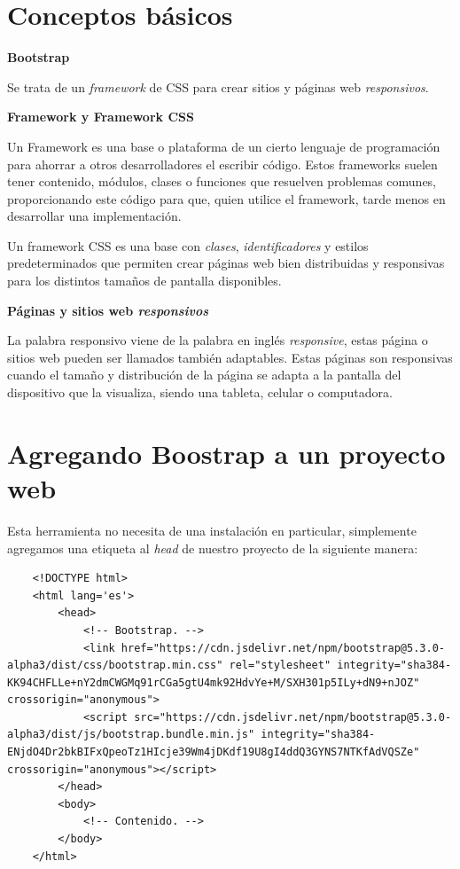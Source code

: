 
\section{Conceptos básicos}

\textbf{Bootstrap}

Se trata de un \textit{framework} de CSS para crear sitios y páginas web \textit{responsivos}.

\textbf{Framework y Framework CSS}

Un Framework es una base o plataforma de un cierto lenguaje de programación para ahorrar a otros desarrolladores el escribir código. Estos frameworks suelen tener contenido, módulos, clases o funciones que resuelven problemas comunes, proporcionando este código para que, quien utilice el framework, tarde menos en desarrollar una implementación.

Un framework CSS es una base con \textit{clases}, \textit{identificadores} y estilos predeterminados que permiten crear páginas web bien distribuidas y responsivas para los distintos tamaños de pantalla disponibles.

\textbf{Páginas y sitios web \textit{responsivos}}

La palabra responsivo viene de la palabra en inglés \textit{responsive}, estas página o sitios web pueden ser llamados también adaptables. Estas páginas son responsivas cuando el tamaño y distribución de la página se adapta a la pantalla del dispositivo que la visualiza, siendo una tableta, celular o computadora.



\section{Agregando Boostrap a un proyecto web}

Esta herramienta no necesita de una instalación en particular, simplemente agregamos una etiqueta al \textit{head} de nuestro proyecto de la siguiente manera:
\begin{lstlisting}
    <!DOCTYPE html>
    <html lang='es'>
        <head>
            <!-- Bootstrap. -->
            <link href="https://cdn.jsdelivr.net/npm/bootstrap@5.3.0-alpha3/dist/css/bootstrap.min.css" rel="stylesheet" integrity="sha384-KK94CHFLLe+nY2dmCWGMq91rCGa5gtU4mk92HdvYe+M/SXH301p5ILy+dN9+nJOZ" crossorigin="anonymous">
            <script src="https://cdn.jsdelivr.net/npm/bootstrap@5.3.0-alpha3/dist/js/bootstrap.bundle.min.js" integrity="sha384-ENjdO4Dr2bkBIFxQpeoTz1HIcje39Wm4jDKdf19U8gI4ddQ3GYNS7NTKfAdVQSZe" crossorigin="anonymous"></script>
        </head>
        <body>
            <!-- Contenido. -->
        </body>
    </html>
\end{lstlisting}

